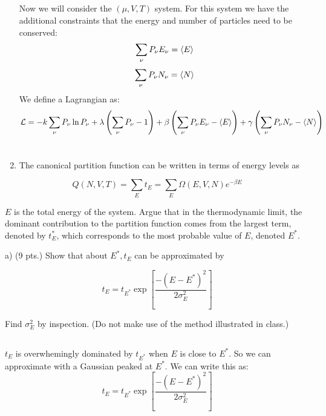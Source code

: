 \documentclass[10pt]{article}
\begin{document}
\begin{enumerate}
\subsection{}
Now we will consider the $(\mu,V,T)$ system. For this system we have the additional constraints that the energy and number of particles need to be conserved:
\begin{equation}
  \sum_{\nu} P_{\nu} E_{\nu} = \expval{E}
\end{equation}
\begin{equation}  
  \sum_{\nu} P_{\nu} N_{\nu} = \expval{N}
\end{equation}
We define a Lagrangian as:
\begin{equation}
  \mathcal{L} = - k \sum_{\nu} P_{\nu} \ln P_{\nu} + \lambda \left( \sum_{\nu} P_{\nu} - 1 \right) + \beta \left( \sum_{\nu} P_{\nu} E_{\nu} - \expval{E} \right) + \gamma \left( \sum_{\nu} P_{\nu} N_{\nu} - \expval{N} \right)
\end{equation}
\section{}
  \item The canonical partition function can be written in terms of energy levels as

\end{enumerate}

$$
Q(N, V, T)=\sum_{E} t_{E}=\sum_{E} \Omega(E, V, N) e^{-\beta E}
$$

$E$ is the total energy of the system. Argue that in the thermodynamic limit, the dominant contribution to the partition function comes from the largest term, denoted by $t_{E}^{*}$, which corresponds to the most probable value of $E$, denoted $E^{*}$.

a) (9 pts.) Show that about $E^{*}, t_{E}$ can be approximated by

$$
t_{E}=t_{E^{*}} \exp \left[\frac{-\left(E-E^{*}\right)^{2}}{2 \sigma_{E}^{2}}\right]
$$

Find $\sigma_{E}^{2}$ by inspection. (Do not make use of the method illustrated in class.)
\subsection{}
$t_E$ is overwhemingly dominated by $t_{E^{*}}$ when $E$ is close to $E^{*}$. So we can approximate with a Gaussian peaked at $E^{*}$. We can write this as:
\begin{equation}
  t_{E} = t_{E^{*}} \exp \left[ \frac{- \left( E - E^{*} \right)^{2}}{2 \sigma_{E}^{2}} \right]
\end{equation}
\end{document}

